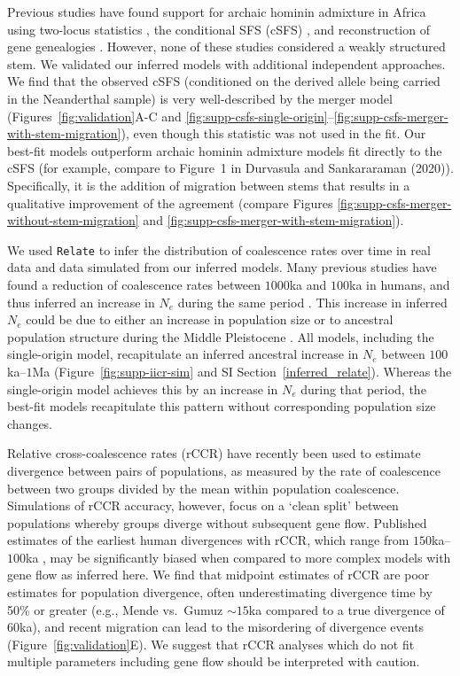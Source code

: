 \documentclass[]{article}
\begin{document}
Previous studies have found support for archaic hominin admixture in Africa
using two-locus statistics \citep{Hsieh2016-gk,Ragsdale2019-nt}, the
conditional SFS (cSFS) \citep{Durvasula2020-td}, and reconstruction of gene
genealogies \citep{Speidel2019-nj}. However, none of these studies considered a
weakly structured stem. We validated our inferred models with additional
independent approaches. We find that the observed cSFS (conditioned on the
derived allele being carried in the Neanderthal sample) is very well-described
by the merger model (Figures~\ref{fig:validation}A-C and
\ref{fig:supp-csfs-single-origin}--\ref{fig:supp-csfs-merger-with-stem-migration}),
even though this statistic was not used in the fit. Our best-fit models
outperform archaic hominin admixture models fit directly to the cSFS (for
example, compare to Figure~1 in Durvasula and Sankararaman
(2020)\citep{Durvasula2020-td}). Specifically, it is the addition of migration
between stems that results in a qualitative improvement of the agreement
(compare Figures \ref{fig:supp-csfs-merger-without-stem-migration}  and
\ref{fig:supp-csfs-merger-with-stem-migration}).

We used \texttt{Relate} \citep{Speidel2019-nj} to infer the distribution of
coalescence rates over time in real data and data simulated from our inferred
models. Many previous studies have found a reduction of coalescence rates
between $1000$ka and $100$ka in humans, and thus inferred an increase in $N_e$
during the same period \citep{Li2011-le}.  This increase in inferred $N_e$
could be due to either an increase in population size or to ancestral
population structure during the Middle Pleistocene \citep{Mazet2016-wn}.  All
models, including the single-origin model, recapitulate an inferred ancestral
increase in $N_e$ between $100$ka--$1$Ma
(Figure~\ref{fig:supp-iicr-sim} and SI
Section~\ref{inferred_relate}). Whereas the single-origin model achieves this by an
increase in $N_e$ during that period, the best-fit models recapitulate this
pattern without corresponding population size changes.     

Relative cross-coalescence rates (rCCR) have recently been used to estimate
divergence between pairs of populations, as measured by the rate of
coalescence between two groups divided by the mean within population
coalescence. Simulations of rCCR accuracy, however, focus on a ‘clean split’
between populations whereby groups diverge without subsequent gene flow.
Published estimates of the earliest human divergences with rCCR, which range
from $150$ka--$100$ka \citep{Bergstrom2021-iw}, may be significantly biased when
compared to more complex models with gene flow as inferred here. We find that
midpoint estimates of rCCR are poor estimates for population divergence, often
underestimating divergence time by 50\% or greater (e.g., Mende vs.\ Gumuz
$\sim15$ka compared to a true divergence of $60$ka), and recent migration can
lead to the misordering of divergence events (Figure~\ref{fig:validation}E). We
suggest that rCCR analyses which do not fit multiple parameters including gene
flow should be interpreted with caution.
\end{document}
